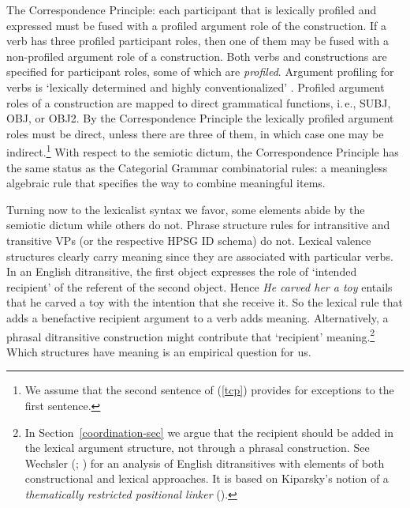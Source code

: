 \ea
The Correspondence Principle:  each participant that is lexically profiled and expressed must be
fused with a profiled argument role of the construction.  If a verb has three profiled participant
roles, then one of them may be fused with a non-profiled argument role of a construction. \citep[]{Goldberg95a}\label{tcp}
\z
Both verbs and constructions are specified for participant roles, some of which are \emph{profiled}.
Argument profiling for verbs is `lexically determined and highly conventionalized'
\citep[]{Goldberg95a}.  Profiled argument roles of a construction are mapped to direct
grammatical functions, i.\,e., SUBJ, OBJ, or OBJ2.  By the Correspondence Principle the lexically profiled argument
roles must be direct, unless there are three of them, in which case one may be indirect.\footnote{We
  assume that the second sentence of (\ref{tcp}) provides for exceptions to the first sentence.}
With respect to the semiotic dictum, the Correspondence Principle has the same status as the
Categorial Grammar combinatorial rules: a meaningless algebraic rule that specifies the way to
combine meaningful items.   

Turning now to the lexicalist syntax we favor, some elements abide by the semiotic dictum while
others do not.  Phrase structure rules for intransitive and transitive VPs (or the respective HPSG ID schema)
do not.  Lexical valence structures clearly carry meaning since they are associated with particular
verbs.  In an English ditransitive, the first object expresses the role of `intended recipient' of
the referent of the second object.
Hence \emph{He carved her a toy} entails that he carved a toy with the intention that she receive
it.  So the lexical rule that adds a benefactive recipient argument to a verb adds meaning.  Alternatively, a phrasal ditransitive construction might
contribute that `recipient' meaning.\footnote{In Section~\ref{coordination-sec} we argue that the
  recipient should be added in the lexical argument structure, not through a phrasal construction.
  See Wechsler (\citeyear[--113]{Wechsler91a-u}; \citeyear[--89]{Wechsler95a-u}) for an
  analysis of English ditransitives with elements of both constructional and lexical approaches.  It
  is based on Kiparsky's notion of a \emph{thematically
    restricted positional linker} (\citeyear{Kiparsky87a-u, Kiparsky88a-u}).}  Which structures have
meaning is an empirical question for us. 



